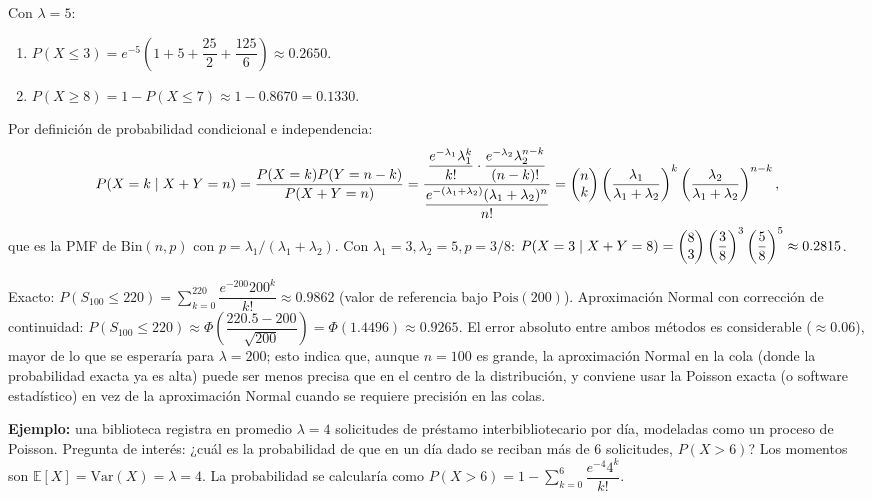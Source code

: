 \begin{solproblema}[prob:8fd3390]
	Con $\lambda=5$:
	\begin{enumerate}
		\item $P(X\le3) = e^{-5}\left(1+5+\dfrac{25}{2}+\dfrac{125}{6}\right) \approx 0.2650$.
		\item $P(X\ge8) = 1-P(X\le7) \approx 1-0.8670 = 0.1330$.
	\end{enumerate}
\end{solproblema}

\begin{solproblema}
	Por definición de probabilidad condicional e independencia:
	\begin{align*}
		P(X=k\mid X+Y=n) = \dfrac{P(X=k)P(Y=n-k)}{P(X+Y=n)} = \dfrac{\dfrac{e^{-\lambda_1}\lambda_1^k}{k!}\cdot\dfrac{e^{-\lambda_2}\lambda_2^{n-k}}{(n-k)!}}{\dfrac{e^{-(\lambda_1+\lambda_2)}(\lambda_1+\lambda_2)^n}{n!}} = \begin{pmatrix} n \\ k\end{pmatrix}\left(\dfrac{\lambda_1}{\lambda_1+\lambda_2}\right)^k\left(\dfrac{\lambda_2}{\lambda_1+\lambda_2}\right)^{n-k},
	\end{align*}
	que es la PMF de $\text{Bin}(n,p)$ con $p=\lambda_1/(\lambda_1+\lambda_2)$. Con $\lambda_1=3,\lambda_2=5,p=3/8$: $P(X=3\mid X+Y=8) = \begin{pmatrix} 8 \\ 3\end{pmatrix}\left(\dfrac{3}{8}\right)^3\left(\dfrac{5}{8}\right)^5 \approx 0.2815$.
\end{solproblema}

\begin{solproblema}[prob:5e9408a]
	Exacto: $P(S_{100}\le220) = \sum_{k=0}^{220}\dfrac{e^{-200}200^k}{k!} \approx 0.9862$ (valor de referencia bajo $\text{Pois}(200)$). Aproximación Normal con corrección de continuidad: $P(S_{100}\le220) \approx \Phi\!\left(\dfrac{220.5-200}{\sqrt{200}}\right) = \Phi(1.4496) \approx 0.9265$. El error absoluto entre ambos métodos es considerable ($\approx0.06$), mayor de lo que se esperaría para $\lambda=200$; esto indica que, aunque $n=100$ es grande, la aproximación Normal en la cola (donde la probabilidad exacta ya es alta) puede ser menos precisa que en el centro de la distribución, y conviene usar la Poisson exacta (o software estadístico) en vez de la aproximación Normal cuando se requiere precisión en las colas.
\end{solproblema}

\begin{solproblema}[prob:9dc367e]
	\textbf{Ejemplo:} una biblioteca registra en promedio $\lambda=4$ solicitudes de préstamo interbibliotecario por día, modeladas como un proceso de Poisson. Pregunta de interés: ¿cuál es la probabilidad de que en un día dado se reciban más de $6$ solicitudes, $P(X>6)$? Los momentos son $\mathbb{E}[X]=\text{Var}(X)=\lambda=4$. La probabilidad se calcularía como $P(X>6) = 1-\sum_{k=0}^{6}\dfrac{e^{-4}4^k}{k!}$.
\end{solproblema}

